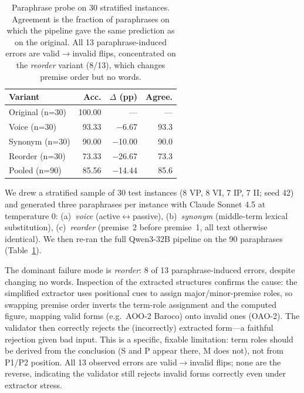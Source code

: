 \documentclass[11pt]{article}
\begin{document}
\begin{table}[t]
\centering
\small
\setlength{\tabcolsep}{4pt}
\begin{tabular}{@{}lrrr@{}}
\toprule
\textbf{Variant} & \textbf{Acc.} & \textbf{$\Delta$ (pp)} & \textbf{Agree.} \\
\midrule
Original (n=30)    & 100.00 &  ---   & --- \\
\midrule
Voice     (n=30)   &  93.33 & \phantom{0}$-$6.67 & 93.3 \\
Synonym   (n=30)   &  90.00 &    $-$10.00 & 90.0 \\
Reorder   (n=30)   &  73.33 &    $-$26.67 & 73.3 \\
Pooled    (n=90)   &  85.56 &    $-$14.44 & 85.6 \\
\bottomrule
\end{tabular}
\caption{Paraphrase probe on 30 stratified instances. Agreement is the fraction of paraphrases on which the pipeline gave the same prediction as on the original. All 13 paraphrase-induced errors are valid$\to$invalid flips, concentrated on the \emph{reorder} variant (8/13), which changes premise order but no words.}
\label{tab:paraphrase}
\end{table}

We drew a stratified sample of 30 test instances (8 VP, 8 VI, 7 IP, 7 II; seed 42) and generated three paraphrases per instance with Claude Sonnet 4.5 at temperature 0: (a)~\emph{voice} (active$\leftrightarrow$passive), (b)~\emph{synonym} (middle-term lexical substitution), (c)~\emph{reorder} (premise~2 before premise~1, all text otherwise identical). We then re-ran the full Qwen3-32B pipeline on the 90 paraphrases (Table~\ref{tab:paraphrase}).

The dominant failure mode is \emph{reorder}: 8 of 13 paraphrase-induced errors, despite changing no words. Inspection of the extracted structures confirms the cause: the simplified extractor uses positional cues to assign major/minor-premise roles, so swapping premise order inverts the term-role assignment and the computed figure, mapping valid forms (e.g.\ AOO-2 Baroco) onto invalid ones (OAO-2). The validator then correctly rejects the (incorrectly) extracted form---a faithful rejection given bad input. This is a specific, fixable limitation: term roles should be derived from the conclusion (S and P appear there, M does not), not from P1/P2 position. All 13 observed errors are valid$\to$invalid flips; none are the reverse, indicating the validator still rejects invalid forms correctly even under extractor stress.
\end{document}
